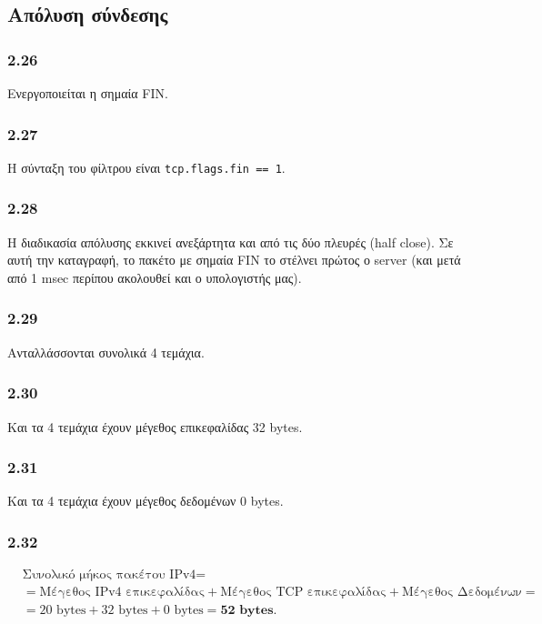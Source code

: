 		\subsection*{Απόλυση σύνδεσης}
		
		\subsubsection*{2.26} 
			Ενεργοποιείται η σημαία FIN.
		
		\subsubsection*{2.27} 
			Η σύνταξη του φίλτρου είναι \verb|tcp.flags.fin == 1|.
					
		\subsubsection*{2.28} 
			Η διαδικασία απόλυσης εκκινεί ανεξάρτητα και από τις δύο πλευρές (half close). Σε αυτή την καταγραφή, το πακέτο με σημαία FIN το στέλνει πρώτος ο server (και μετά από 1 msec περίπου ακολουθεί και ο υπολογιστής μας).
		
		\subsubsection*{2.29} 
			Ανταλλάσσονται συνολικά 4 τεμάχια.
		
		\subsubsection*{2.30} 
			Και τα 4 τεμάχια έχουν μέγεθος επικεφαλίδας 32 bytes.
		
		\subsubsection*{2.31} 
			Και τα 4 τεμάχια έχουν μέγεθος δεδομένων 0 bytes.
		
		\subsubsection*{2.32} 
			\begin{align*}
				& \text{Συνολικό μήκος πακέτου IPv4} = \\
				& = \text{Μέγεθος IPv4 επικεφαλίδας} + \text{Μέγεθος TCP επικεφαλίδας} + \text{Μέγεθος Δεδομένων} = \\
				& = 20 \text{ bytes} + 32 \text{ bytes} + 0 \text{ bytes} = \textbf{52 bytes.}
			\end{align*}
		
